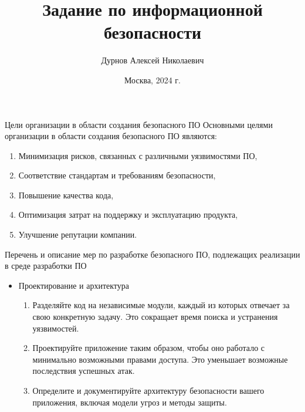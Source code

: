 \documentclass[10pt]{beamer}
\title[]{Задание по информационной безопасности}
\author{Дурнов Алексей Николаевич}
\institute[МФТИ]{
    Московский физико-технический институт\\
    Физтех-школа радиотехники и компьютерных технологий\\
}
\date{Москва, 2024 г.}
\begin{document}
\begin{frame}
    \titlepage
    \thispagestyle{empty}
\end{frame}

\begin{frame}{Цели организации в области создания безопасного ПО}
    Основными целями организации в области создания безопасного ПО являются:

    \begin{enumerate}
        \item Минимизация рисков, связанных с различными уязвимостями ПО,
        \item Соответствие стандартам и требованиям безопасности,
        \item Повышение качества кода,
        \item Оптимизация затрат на поддержку и эксплуатацию продукта,
        \item Улучшение репутации компании.
    \end{enumerate}

\end{frame}

\begin{frame}{Перечень и описание мер по разработке безопасного ПО, подлежащих реализации в среде разработки ПО}
    \begin{itemize}
        \item Проектирование и архитектура
        \begin{enumerate}
            \item Разделяйте код на независимые модули, каждый из которых отвечает за свою конкретную задачу. Это сокращает время поиска и устранения уязвимостей.
            \item Проектируйте приложение таким образом, чтобы оно работало с минимально возможными правами доступа. Это уменьшает возможные последствия успешных атак.
            \item Определите и документируйте архитектуру безопасности вашего приложения, включая модели угроз и методы защиты.
        \end{enumerate}
    \end{itemize}
\end{frame}
\end{document}
